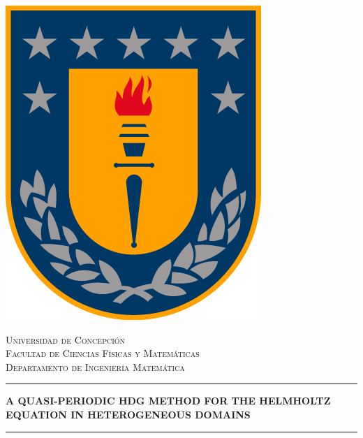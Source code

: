 \documentclass[13pt,letterpaper,hidelinks]{book}
\begin{document}
\begin{titlepage}
\begin{center}
\includegraphics[scale=0.3]{img/esc.png} 
\end{center}
\newcommand{\HRule}{\rule{\linewidth}{0.5mm}} %
\center %
\textsc{\Large Universidad de Concepci\'on}\\ %
\textsc{\large Facultad de Ciencias F\'isicas y Matem\'aticas}\\
\textsc{\large Departamento de Ingenier\'ia Matem\'atica}\\[2cm]
\begin{center}
\hrule
\vspace{0.5cm}
{\bf \Large A QUASI-PERIODIC HDG METHOD FOR THE HELMHOLTZ EQUATION IN HETEROGENEOUS DOMAINS}
\vspace{0.5cm}
\hrule
\end{center}

\end{titlepage}
\end{document}
